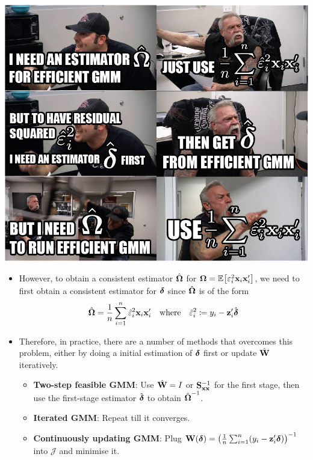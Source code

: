\documentclass{beamer}
\begin{document}
\begin{frame}{}
	\centerline{\includegraphics[height=\textheight]{efficient_gmm.png}}
\end{frame}

\begin{frame}{}
	\begin{itemize}
		\item
			However, to obtain a consistent estimator $\hat{\boldsymbol{\Omega}}$ for
			$\boldsymbol{\Omega}=\operatorname{\mathbb{E}}_{}\!\left[\varepsilon_i^2\mathbf{x}_i\mathbf{x}_i'\right]$, we need to first obtain a
			consistent estimator for $\boldsymbol{\delta}$ since $\hat{\boldsymbol{\Omega}}$ is of the
			form
			\begin{align*}
				\hat{\boldsymbol{\Omega}} = \frac1n \sum_{i=1}^{n}\hat{\varepsilon}_i^2\mathbf{x}_i\mathbf{x}_i'
				\quad\text{where}\quad
				\hat{\varepsilon}_i^2 \coloneqq y_i - \mathbf{z}_i'\hat{\boldsymbol{\delta}}
			\end{align*}
		\item
			Therefore, in practice, there are a number of methods that
			overcomes this problem, either by doing a initial estimation of
			$\boldsymbol{\delta}$ first or update $\hat{\mathbf{W}}$ iteratively.
			\begin{itemize}
				\item \textbf{Two-step feasible GMM}:
					Use $\hat{\mathbf{W}}=I$ or $\mathbf{S}_{\mathbf{x}\mathbf{x}}^{-1}$ for the first stage,
					then use the first-stage estimator $\hat{\boldsymbol{\delta}}$ to obtain $\hat{\boldsymbol{\Omega}}^{-1}$.
				\item \textbf{Iterated GMM}:
					Repeat till it converges.
				\item \textbf{Continuously updating GMM}:
					Plug $\mathbf{W}(\boldsymbol{\delta})=\left(\frac1n\sum_{i=1}^{n}(y_i-\mathbf{z}_i'\boldsymbol{\delta})\right)^{-1}$ into $\mathcal{J}$ and minimise it.
			\end{itemize}
	\end{itemize}
\end{frame}
\end{document}
